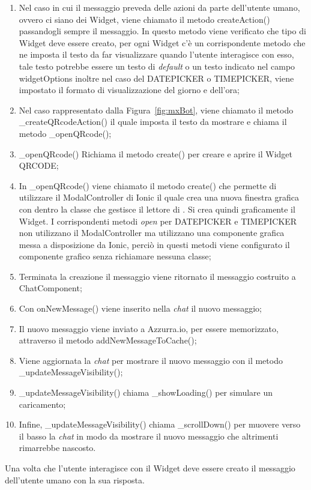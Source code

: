 \begin{enumerate}
	\item Nel caso in cui il messaggio preveda delle azioni da parte dell'utente umano, ovvero ci siano dei Widget, viene chiamato il metodo createAction() passandogli sempre il messaggio. In questo metodo viene verificato che tipo di Widget deve essere creato, per ogni Widget c'è un corrispondente metodo che ne imposta il testo da far visualizzare quando l'utente interagisce con esso, tale testo potrebbe essere un testo di \emph{default} o un testo indicato nel campo widgetOptions inoltre nel caso del DATEPICKER o TIMEPICKER, viene impostato il formato di visualizzazione del giorno e dell'ora;
	\item Nel caso rappresentato dalla Figura~\ref{fig:mxBot}, viene chiamato il metodo \_createQRcodeAction()
	 il quale imposta il testo da mostrare e chiama il metodo \_openQRcode();
	\item \_openQRcode() Richiama il metodo create() per creare e aprire il Widget QRCODE;
	\item In \_openQRcode() viene chiamato il metodo create() che permette di utilizzare il ModalController di Ionic il quale crea una nuova finestra grafica con dentro la classe che gestisce il lettore di . Si crea quindi graficamente il Widget. I corrispondenti metodi \emph{open} per DATEPICKER e TIMEPICKER non utilizzano il ModalController ma utilizzano una componente grafica messa a disposizione da Ionic, perciò in questi metodi viene configurato il componente grafico senza richiamare nessuna classe;
	\item Terminata la creazione il messaggio viene ritornato il messaggio costruito a ChatComponent;
	\item Con onNewMessage() viene inserito nella \emph{chat} il nuovo messaggio;
	\item Il nuovo messaggio viene inviato a Azzurra.io, per essere memorizzato, attraverso il metodo addNewMessageToCache();
	\item Viene aggiornata la \emph{chat} per mostrare il nuovo messaggio con il metodo \_updateMessageVisibility();
	\item \_updateMessageVisibility() chiama \_showLoading() per simulare un caricamento;
	\item Infine, \_updateMessageVisibility() chiama \_scrollDown() per muovere verso il basso la \emph{chat} in modo da mostrare il nuovo messaggio che altrimenti rimarrebbe nascosto.
\end{enumerate}

Una volta che l'utente interagisce con il Widget deve essere creato il messaggio dell'utente umano con la sua risposta. 
\clearpage
